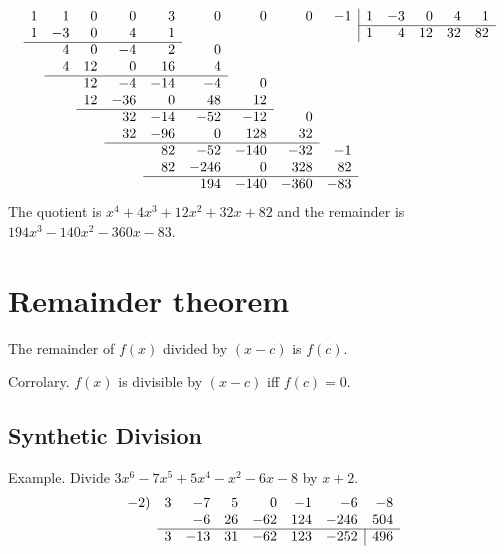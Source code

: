 \documentclass{article}
\begin{document}
        \begin{gather*}
        \begin{array}{rrrrrrrrrrrrrr}
                1 &  1 &  0 &   0 &   3 &    0 &    0 &    0 &  -1 & \multicolumn{1}{|r}{1} & -3 &  0 &  4 &  1\\ \cline{10-14}
                1 & -3 &  0 &   4 &   1 &      &      &      &     & \multicolumn{1}{|r}{1} &  4 & 12 & 32 & 82\\ \cline{1-5}
                  &  4 &  0 &  -4 &   2 &    0\\
                  &  4 & 12 &   0 &  16 &    4\\ \cline{2-6}
                  &    & 12 &  -4 & -14 &   -4 &    0\\
                  &    & 12 & -36 &   0 &   48 &   12\\ \cline{3-7}
                  &    &    &  32 & -14 &  -52 &  -12 &    0\\
                  &    &    &  32 & -96 &    0 &  128 &   32\\ \cline{4-8}
                  &    &    &     &  82 &  -52 & -140 &  -32 &  -1\\
                  &    &    &     &  82 & -246 &    0 &  328 &  82\\ \cline{5-9}
                  &    &    &     &     &  194 & -140 & -360 & -83\\
        \end{array}
        \end{gather*}
        The quotient is $x^4 + 4x^3 + 12x^2 + 32x + 82$ and the remainder is $194x^3 - 140x^2 - 360x - 83$.
       
        \section{Remainder theorem}

        The remainder of $f(x)$ divided by $(x - c)$ is $f(c)$.

        Corrolary. $f(x)$ is divisible by $(x - c)$ iff $f(c) = 0$.

        \subsection{Synthetic Division}

        Example. Divide $3x^6 - 7x^5 + 5x^4 - x^2 - 6x - 8$ by $x + 2$.
        \begin{gather*}
        \begin{array}{rrrrrrrr}
                \left.-2\right) & 3 &  -7 &  5 &   0 &  -1 &   -6 &                       -8\\      
                                &   &  -6 & 26 & -62 & 124 & -246 &                      504\\
                \cline{2-8}
                                & 3 & -13 & 31 & -62 & 123 & -252 & \multicolumn{1}{|r}{496}\\
        \end{array}
        \end{gather*}
\end{document}

